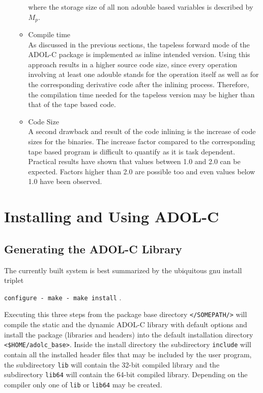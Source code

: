 \documentclass[11pt,twoside]{article}
\begin{document}
\begin{itemize}
\begin{itemize}
      where the storage size of all non {\sf adouble} based variables is described by $M_p$.
    \item Compile time\\
      As discussed in the previous sections, the tapeless forward mode of
      the ADOL-C package is implemented as inline intended version. Using
      this approach results in a higher source code size, since every
      operation involving at least one {\sf adouble} stands for the
      operation itself as well as for the corresponding derivative
      code after the inlining process. Therefore, the compilation time
      needed for the tapeless version may be higher than that of the tape based code. 
    \item Code Size\\
      A second drawback and result of the code inlining is the
      increase of code sizes for the binaries. The increase
      factor compared to the corresponding tape based program is
      difficult to quantify as it is task dependent. Practical results
      have shown that values between 1.0 and 2.0 can be
      expected. Factors higher than 2.0 are possible too and even
      values below 1.0 have been observed. 
    \end{itemize}
\end{itemize}
%
\section{Installing and Using ADOL-C}
\label{install}
%
\subsection{Generating the ADOL-C Library}
\label{genlib}
%
The currently built system is best summarized by the ubiquitous gnu
install triplet 
\begin{center}
\verb=configure - make - make install= .
\end{center}
Executing this three steps from the package base directory
\verb=</SOMEPATH/=\texttt{\packagetar}\verb=>= will compile the static and the dynamic
ADOL-C library with default options and install the package (libraries
and headers) into the default installation directory {\tt
  \verb=<=\$HOME/adolc\_base\verb=>=}. Inside the install directory
the subdirectory \verb=include= will contain all the installed header
files that may be included by the user program, the subdirectory
\verb=lib= will contain the 32-bit compiled library 
and the subdirectory \verb=lib64= will contain the 64-bit compiled
library. Depending on the compiler only one of \verb=lib= or
\verb=lib64= may be created.
\end{document}
